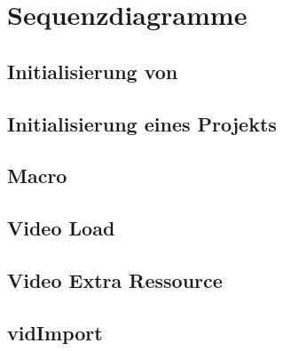 \chapter {Sequenzdiagramme}

\section{Initialisierung von \projektTitel}


\section{Initialisierung eines Projekts}


\section{Macro}


\section{Video Load}


\section{Video Extra Ressource}


\section{vidImport}
